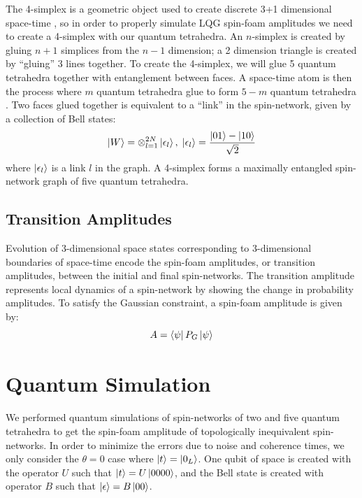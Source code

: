 \documentclass[a4paper,11pt,aps,tightenlines,nofootinbib]{revtex4}
\begin{document}
        The 4-simplex is a geometric object used to create discrete 3+1 dimensional space-time \cite{simplical-decomp}, so in order to 
        properly simulate LQG spin-foam amplitudes we need to create a 4-simplex with our quantum tetrahedra.
        An $n$-simplex is created by gluing $n+1$ simplices from the $n-1$ dimension; a 2 dimension triangle is created by ``gluing'' 3 lines 
        together. To create the 4-simplex, we will glue 5 quantum tetrahedra together with entanglement between faces. 
        A space-time atom is then the process where $m$ quantum tetrahedra glue to form $5-m$ quantum tetrahedra \cite{covariant-lqg}. Two faces glued together 
        is equivalent to a ``link'' in the spin-network, given by a collection of Bell states:
        \begin{equation}
                \ket{W} = \otimes_{l=1}^{2N} \ket{\epsilon_l}, \; \ket{\epsilon_l} = \frac{\ket{01}-\ket{10}}{\sqrt{2}}
        \end{equation}
        where $\ket{\epsilon_l}$ is a link $l$ in the graph. A 4-simplex forms a maximally entangled spin-network graph of five quantum tetrahedra. 

\subsection{Transition Amplitudes}
        Evolution of 3-dimensional space states corresponding to 3-dimensional boundaries of space-time encode the spin-foam amplitudes, or transition amplitudes, between the 
        initial and final spin-networks. The transition amplitude represents local dynamics of a spin-network \cite{ooguri} by showing the change in probability amplitudes. To satisfy 
        the Gaussian constraint, a spin-foam amplitude is given by:
        \begin{equation}
                A = \bra{\psi}P_G\ket{\psi}
        \end{equation}


\section{Quantum Simulation}
        We performed quantum simulations of spin-networks of two and five quantum tetrahedra to get the spin-foam amplitude of topologically inequivalent spin-networks.
        In order to minimize the errors due to noise and coherence times, we only consider the $\theta=0$ case where $\ket{t} = \ket{0_L}$. One qubit of space is created with 
        the operator $U$ such that $\ket{t} = U\ket{0000}$, and the Bell state is created with operator $B$ such that $\ket{\epsilon} = B\ket{00}$.
\end{document}
